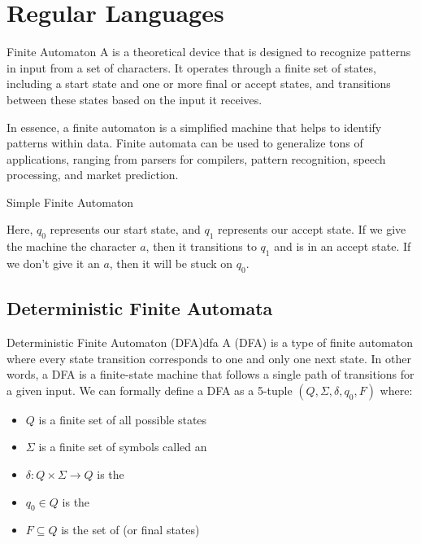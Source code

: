 \chapter{Regular Languages}
\begin{dfnbox}{Finite Automaton}{}
    A  is a theoretical device that is designed to recognize patterns in input from a set of characters. It operates through a finite set of states, including a start state and one or more final or accept states, and transitions between these states based on the input it receives.
\end{dfnbox}

In essence, a finite automaton is a simplified machine that helps to identify patterns within data. Finite automata can be used to generalize tons of applications, ranging from parsers for compilers, pattern recognition, speech processing, and market prediction.

\begin{exbox}{Simple Finite Automaton}{}
    \begin{center}\end{center}
    Here, $q_0$ represents our start state, and $q_1$ represents our accept state. If we give the machine the character $a$, then it transitions to $q_1$ and is in an accept state. If we don't give it an $a$, then it will be stuck on $q_0$.
\end{exbox}

\section{Deterministic Finite Automata}

\begin{dfnbox}{Deterministic Finite Automaton (DFA)}{dfa}
    A  (DFA) is a type of finite automaton where every state transition corresponds to one and only one next state. In other words, a DFA is a finite-state machine that follows a single path of transitions for a given input.
    \tcblower
    We can formally define a DFA as a 5-tuple $(Q, \Sigma, \delta, q_0, F)$ where:
    \begin{itemize}[noitemsep]
        \item $Q$ is a finite set of all possible states
        \item $\Sigma$ is a finite set of symbols called an 
        \item $\delta : Q \times \Sigma \to Q$ is the 
        \item $q_0 \in Q$ is the 
        \item $F \subseteq Q$ is the set of  (or final states)
    \end{itemize}
\end{dfnbox}

